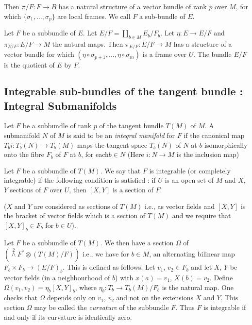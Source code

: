 Then $\pi/F:F\to B$ has a natural structure of a vector bundle of rank $p$ over $M$, for which $\{\sigma_{1},\ldots,\sigma_{p}\}$ are local frames. We call $F$ a sub-bundle of $E$.

Let $F$ be a subbundle of $E$. Let $E/F=\coprod\limits_{b\in M}E_{b}/F_{b}$. Let $\eta:E\to E/F$ and $\pi_{E/F}:E/F\to M$ the natural maps. Then $\pi_{E/F}:E/F\to M$ has a structure of a vector bundle for which $(\eta\circ \sigma_{p+1},\ldots,\eta\circ\sigma_{m})$ is a frame over $U$. The bundle $E/F$ is the quotient of $E$ by $F$.

\subsection*{Integrable sub-bundles of the tangent bundle : Integral Submanifolds}

Let $F$ be a subbundle of rank $p$ of the tangent bundle $T(M)$ of $M$. A submanifold $N$ of $M$ is said to be an {\em integral manifold} for $F$ if the canonical map $T_{b}i:T_{b}(N)\to T_{b}(M)$ maps the tangent space $T_{b}(N)$ of $N$ at $b$ isomorphically onto the fibre $F_{b}$ of $F$ at $b$, for each\pageoriginale $b\in N$ (Here $i:N\to M$ is the inclusion map)

\begin{defi*}
Let $F$ be a subbundle of $T(M)$. We say that $F$ is integrable (or completely integrable) if the following condition is satisfied : if $U$ is an open set of $M$ and $X$, $Y$ sections of $F$ over $U$, then $[X,Y]$ is a section of $F$.
\end{defi*}

($X$ and $Y$ are considered as sections of $T(M)$ i.e., as vector fields and $[X,Y]$ is the bracket of vector fields which is a section of $T(M)$ and we require that $[X,Y]_{b}\in F_{b}$ for $b\in U$).

\begin{remark*}
Let $F$ be a subbundle of $T(M)$. We then have a section $\Omega$ of $({\displaystyle{\mathop{\wedge}\limits^{2}}}F^{*}\otimes (T(M)/F))$ i.e., we have for $b\in M$, an alternating bilinear map $F_{b}\times F_{b}\to (E/F)_{b}$. This is defined as follows: Let $v_{1}$, $v_{2}\in F_{b}$ and let $X$, $Y$ be vector fields (in a neighbourhood of $b$) with $x(a)=v_{1}$, $X(b)=v_{2}$. Define $\Omega(v_{1},v_{2})=\eta_{b}[X,Y]_{b}$, where $\eta_{b}:T_{b}\to T_{b}(M)/F_{b}$ is the natural map. One checks that $\Omega$ depends only on $v_{1}$, $v_{2}$ and not on the extensions $X$ and $Y$. This section $\Omega$ may be called the {\em curvature} of the subbundle $F$. Thus $F$ is integrable if and only if its curvature is identically zero.
\end{remark*}

